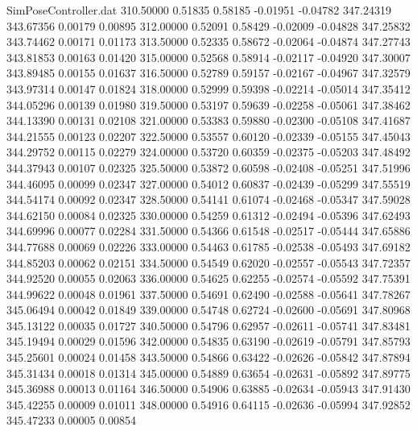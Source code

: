 \begin{filecontents}{SimPoseController.dat}
 310.50000    0.51835    0.58185    -0.01951   -0.04782  347.24319  343.67356    0.00179    0.00895
 312.00000    0.52091    0.58429    -0.02009   -0.04828  347.25832  343.74462    0.00171    0.01173
 313.50000    0.52335    0.58672    -0.02064   -0.04874  347.27743  343.81853    0.00163    0.01420
 315.00000    0.52568    0.58914    -0.02117   -0.04920  347.30007  343.89485    0.00155    0.01637
 316.50000    0.52789    0.59157    -0.02167   -0.04967  347.32579  343.97314    0.00147    0.01824
 318.00000    0.52999    0.59398    -0.02214   -0.05014  347.35412  344.05296    0.00139    0.01980
 319.50000    0.53197    0.59639    -0.02258   -0.05061  347.38462  344.13390    0.00131    0.02108
 321.00000    0.53383    0.59880    -0.02300   -0.05108  347.41687  344.21555    0.00123    0.02207
 322.50000    0.53557    0.60120    -0.02339   -0.05155  347.45043  344.29752    0.00115    0.02279
 324.00000    0.53720    0.60359    -0.02375   -0.05203  347.48492  344.37943    0.00107    0.02325
 325.50000    0.53872    0.60598    -0.02408   -0.05251  347.51996  344.46095    0.00099    0.02347
 327.00000    0.54012    0.60837    -0.02439   -0.05299  347.55519  344.54174    0.00092    0.02347
 328.50000    0.54141    0.61074    -0.02468   -0.05347  347.59028  344.62150    0.00084    0.02325
 330.00000    0.54259    0.61312    -0.02494   -0.05396  347.62493  344.69996    0.00077    0.02284
 331.50000    0.54366    0.61548    -0.02517   -0.05444  347.65886  344.77688    0.00069    0.02226
 333.00000    0.54463    0.61785    -0.02538   -0.05493  347.69182  344.85203    0.00062    0.02151
 334.50000    0.54549    0.62020    -0.02557   -0.05543  347.72357  344.92520    0.00055    0.02063
 336.00000    0.54625    0.62255    -0.02574   -0.05592  347.75391  344.99622    0.00048    0.01961
 337.50000    0.54691    0.62490    -0.02588   -0.05641  347.78267  345.06494    0.00042    0.01849
 339.00000    0.54748    0.62724    -0.02600   -0.05691  347.80968  345.13122    0.00035    0.01727
 340.50000    0.54796    0.62957    -0.02611   -0.05741  347.83481  345.19494    0.00029    0.01596
 342.00000    0.54835    0.63190    -0.02619   -0.05791  347.85793  345.25601    0.00024    0.01458
 343.50000    0.54866    0.63422    -0.02626   -0.05842  347.87894  345.31434    0.00018    0.01314
 345.00000    0.54889    0.63654    -0.02631   -0.05892  347.89775  345.36988    0.00013    0.01164
 346.50000    0.54906    0.63885    -0.02634   -0.05943  347.91430  345.42255    0.00009    0.01011
 348.00000    0.54916    0.64115    -0.02636   -0.05994  347.92852  345.47233    0.00005    0.00854

\end{filecontents}
